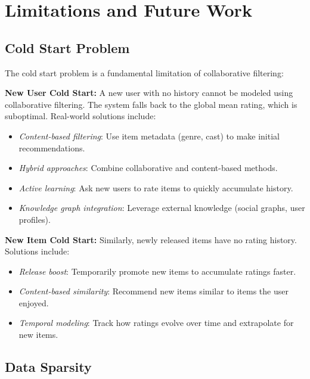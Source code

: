 \section{Limitations and Future Work}
\label{sec:limitations}

\subsection{Cold Start Problem}

The cold start problem is a fundamental limitation of collaborative filtering:

\textbf{New User Cold Start:}
A new user with no history cannot be modeled using collaborative filtering. The system falls back to 
the global mean rating, which is suboptimal. Real-world solutions include:

\begin{itemize}
  \item \textit{Content-based filtering}: Use item metadata (genre, cast) to make initial recommendations.
  
  \item \textit{Hybrid approaches}: Combine collaborative and content-based methods.
  
  \item \textit{Active learning}: Ask new users to rate items to quickly accumulate history.
  
  \item \textit{Knowledge graph integration}: Leverage external knowledge (social graphs, user profiles).
\end{itemize}

\textbf{New Item Cold Start:}
Similarly, newly released items have no rating history. Solutions include:

\begin{itemize}
  \item \textit{Release boost}: Temporarily promote new items to accumulate ratings faster.
  
  \item \textit{Content-based similarity}: Recommend new items similar to items the user enjoyed.
  
  \item \textit{Temporal modeling}: Track how ratings evolve over time and extrapolate for new items.
\end{itemize}

\subsection{Data Sparsity}

